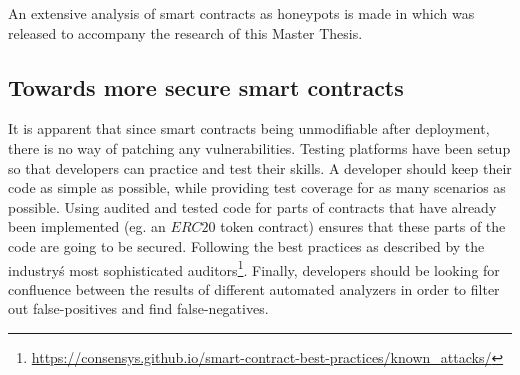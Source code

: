 An extensive analysis of smart contracts as honeypots is made in \cite{honeypots} which was released to accompany the research of this Master Thesis.

\subsection{Towards more secure smart contracts}
It is apparent that since smart contracts being unmodifiable after deployment, there is no way of patching any vulnerabilities. Testing platforms have been setup so that developers can practice and test their skills. A developer should keep their code as simple as possible, while providing test coverage for as many scenarios as possible. Using audited and tested code for parts of contracts that have already been implemented (eg. an $ERC20$ token contract) ensures that these parts of the code are going to be secured. Following the best practices as described by the industry\'s most sophisticated auditors\footnote{\url{https://consensys.github.io/smart-contract-best-practices/known_attacks/}}. Finally, developers should be looking for confluence between the results of different automated analyzers in order to filter out false-positives and find false-negatives.
